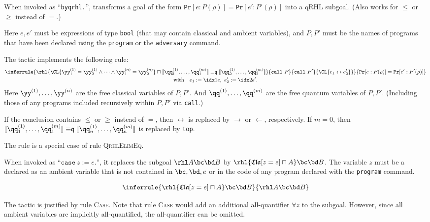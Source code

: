 \documentclass{article}
\renewcommand\ruleref[1]{rule \hbox{\textsc{#1}}}
\begin{document}
When invoked as ``\texttt{byqrhl.}'', transforms a goal of the form
$\mathtt{Pr}[e:P(\rho)] =\mathtt{Pr}[e':P'(\rho)]$
into a qRHL subgoal. (Also works for $\leq$ or $\geq$ instead of $=$.)

Here $e,e'$
must be expressions of type \texttt{bool} (that may contain classical and ambient variables),
and $P,P'$ must be the names of programs that have been declared using the
\texttt{program} or the \texttt{adversary} command.


The tactic implements the following rule:
\begin{multline*}
\inferrule{
  \pb\rhl{\CL{\yy^{(1)}_1=\yy^{(1)}_2\land\dots\land\yy^{(n)}_1=\yy^{(n)}_2}\sqcap
    \llbracket \qq_1^{(1)},\dots,\qq_1^{(m)} \rrbracket
    \mathrel{\mathord\equiv\mathfrak q}
    \llbracket \qq_2^{(1)},\dots,\qq_2^{(m)} \rrbracket}
  {\mathtt{call}\ P}{\mathtt{call}\ P'}
  {\CL{e_1\leftrightarrow e'_2}}
}
{
  \mathtt{Pr}[e:P(\rho)] =\mathtt{Pr}[e':P'(\rho)]
}
\\
\text{with}\quad e_1 := \idx1e,\ e'_2 := \idx2e'.
\end{multline*}
Here $\yy^{(1)},\dots,\yy^{(n)}$
are the free classical variables of $P,P'$.
And $\qq^{(1)},\dots,\qq^{(m)}$
are the free quantum variables of $P,P'$.
(Including those of any programs included recursively within $P,P'$
via \texttt{call}.)

If the conclusion contains $\leq$
or $\geq$
instead of $=$,
then $\leftrightarrow$
is replaced by $\rightarrow$
or $\leftarrow$,
respectively.  If $m=0$,
then
$\llbracket \qq_1^{(1)},\dots,\qq_1^{(m)} \rrbracket
\mathrel{\mathord\equiv\mathfrak q} \llbracket
\qq_n^{(1)},\dots,\qq_n^{(m)} \rrbracket$ is replaced by \texttt{top}.

The rule is a special case of \ruleref{QrhlElimEq}.







When invoked as ``$\mathtt{case}\ z := e\mathtt{.}$'',
it replaces the subgoal $\rhl A\bc\bd B$
by $\rhl{\mathfrak{Cla}[z=e]\sqcap A}\bc\bd B$.
The variable $z$
must be a declared as an ambient variable that is not contained in
$\bc,\bd,e$
or in the code of any program declared with the \texttt{program} command.

\[
\inferrule
{\rhl{\mathfrak{Cla}[z=e]\sqcap A}\bc\bd B}
{\rhl A\bc\bd B}
\]

The tactic is justified by \ruleref{Case}. Note that \ruleref{Case}
would add an additional all-quantifier $\forall z$
to the subgoal. However, since all ambient variables are implicitly
all-quantified, the all-quantifier can be omitted.
\end{document}
